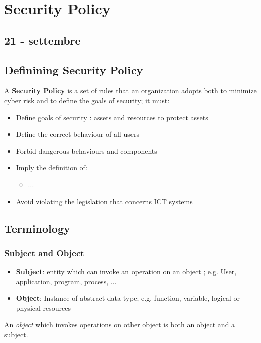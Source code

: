 \chapter{Security Policy}
\label{chapter:security_policy}
\section*{21 - settembre}

\section{Definining Security Policy}
A \textbf{Security Policy} is a set of rules that an organization adopts both to minimize cyber risk and to define the goals of security;
it must:
\begin{itemize}
    \item Define goals of security : assets and resources to protect assets
    \item Define the correct behaviour of all users
    \item Forbid dangerous behaviours and components
    \item Imply the definition of: 
    \begin{itemize}
        \item ...
    \end{itemize}
    \item Avoid violating the legislation that concerns ICT systems
\end{itemize}

\section{Terminology}
\subsection{Subject and Object}
\begin{itemize}
    \item \textbf{Subject}: entity which can invoke an operation on an object
    ;
    e.g. User, application, program, process, ... 
    \item \textbf{Object}:  Instance of abstract data type; e.g. function, variable, logical or physical resources
\end{itemize}
An \textit{object} which invokes operations on other object is both an object and a subject.

